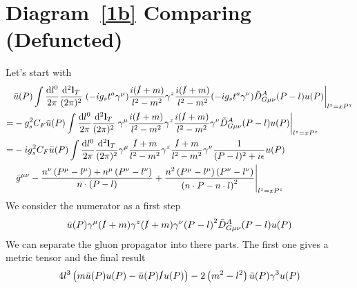 \documentclass{article}
\DeclarePairedDelimiter\bracketM{[}{]}
\let\bqty\relax
\newcommand{\bqty}[1]{\bracketM*{#1}}
\newcommand{\mmd}[2][d]{\ifthenelse{\equal{#1}{1}}{\frac{\dd {#2}}{2\pi}}{\frac{\dd^{#1}{#2}}{(2\pi)^{#1}}}}
\begin{document}
\section{Diagram~\ref{1b} Comparing (Defuncted)\label{sec:dc1}}
Let's start with
\begin{align}
	  & \bar u(P)\int\mmd[1]{l^0}\mmd[2]{\vb{l}_T}\eval{(-ig_st^a\gamma^{\mu})\frac{i(\slashed{l}+m)}{l^2-m^2}\gamma^z\frac{i(\slashed{l}+m)}{l^2-m^2}(-ig_st^a\gamma^{\nu})\tilde D_{G\mu\nu}^A(P-l)u(P)}_{l^z=xP^z}\notag \\
	= & -g_s^2C_F\bar u(P)\int\mmd[1]{l^0}\mmd[2]{\vb{l}_T}\eval{\gamma^{\mu}\frac{i(\slashed{l}+m)}{l^2-m^2}\gamma^z\frac{i(\slashed{l}+m)}{l^2-m^2}\gamma^{\nu}\tilde D_{G\mu\nu}^A(P-l)u(P)}_{l^z=xP^z}\notag            \\
	= & -ig_s^2C_F\bar u(P)\int\mmd[1]{l^0}\mmd[2]{\vb{l}_T}\gamma^{\mu}\frac{\slashed{l}+m}{l^2-m^2}\gamma^z\frac{\slashed{l}+m}{l^2-m^2}\gamma^{\nu}\frac{1}{(P-l)^2+i\epsilon}u(P)\notag                                 \\&\eval{\bqty{\bar{g}^{\mu \nu }-\frac{n^{\nu } \left(P^{\mu }-l^{\mu }\right)+n^{\mu} \left(P^{\nu }-l^{\nu }\right)}{n\cdot (P-l)}+\frac{n^2 \left(P^{\mu }-l^{\mu }\right) \left(P^{\nu }-l^{\nu }\right)}{\left(n\cdot P-n\cdot l\right)^2}}}_{l^z=xP^z}
\end{align}
We consider the numerator as a first step
\begin{align}
	\bar u(P)\gamma^{\mu}(\slashed{l}+m)\gamma^z(\slashed{l}+m)\gamma^{\nu}\bqty{\pqty{P-l}^2\tilde D_{G\mu\nu}^A(P-l)}u(P)
\end{align}
We can separate the gluon propagator into there parts. The first one gives a metric tensor and the final result
\begin{align}
	4 l^3 \left(m \bar{u}(P) u(P)-\bar{u}(P) \slashed{l} u(P)\right)-2 \left(m^2-l^2\right) \bar{u}(P) \gamma^3 u(P)
\end{align}
\end{document}
